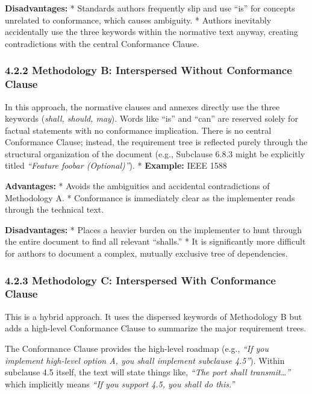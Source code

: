 \documentclass[
]{article}
\begin{document}
\textbf{Disadvantages:} * Standards authors frequently slip and use
``is'' for concepts unrelated to conformance, which causes ambiguity. *
Authors inevitably accidentally use the three keywords within the
normative text anyway, creating contradictions with the central
Conformance Clause.

\subsubsection{4.2.2 Methodology B: Interspersed Without Conformance
Clause}\label{methodology-b-interspersed-without-conformance-clause}

In this approach, the normative clauses and annexes directly use the
three keywords (\emph{shall, should, may}). Words like ``is'' and
``can'' are reserved solely for factual statements with no conformance
implication. There is no central Conformance Clause; instead, the
requirement tree is reflected purely through the structural organization
of the document (e.g., Subclause 6.8.3 might be explicitly titled
\emph{``Feature foobar (Optional)''}). * \textbf{Example:} IEEE 1588

\textbf{Advantages:} * Avoids the ambiguities and accidental
contradictions of Methodology A. * Conformance is immediately clear as
the implementer reads through the technical text.

\textbf{Disadvantages:} * Places a heavier burden on the implementer to
hunt through the entire document to find all relevant ``shalls.'' * It
is significantly more difficult for authors to document a complex,
mutually exclusive tree of dependencies.

\subsubsection{4.2.3 Methodology C: Interspersed With Conformance
Clause}\label{methodology-c-interspersed-with-conformance-clause}

This is a hybrid approach. It uses the dispersed keywords of Methodology
B but adds a high-level Conformance Clause to summarize the major
requirement trees.

The Conformance Clause provides the high-level roadmap (e.g., \emph{``If
you implement high-level option A, you shall implement subclause
4.5''}). Within subclause 4.5 itself, the text will state things like,
\emph{``The port shall transmit\ldots{}''} which implicitly means
\emph{``If you support 4.5, you shall do this.''}
\end{document}
